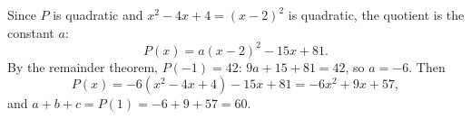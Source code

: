 Since $P$ is quadratic and $x^2-4x+4=(x-2)^2$ is quadratic, the quotient is the constant $a$:
\[P(x)=a(x-2)^2-15x+81.\]
By the remainder theorem, $P(-1)=42$: $9a+15+81=42$, so $a=-6$. Then
\[P(x)=-6\left(x^2-4x+4\right)-15x+81=-6x^2+9x+57,\]
and $a+b+c=P(1)=-6+9+57=\boxed{60}$.
